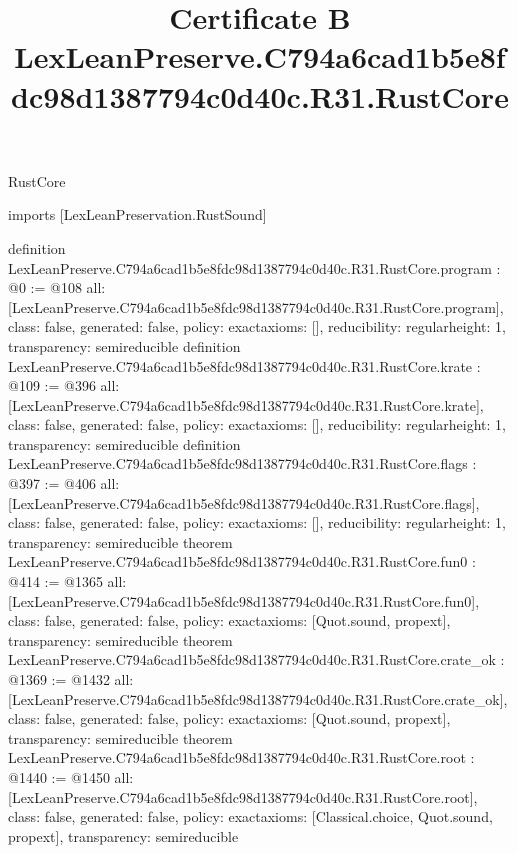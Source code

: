 \begin{lexlean}{RustCore}
\title{Certificate B LexLeanPreserve.C794a6cad1b5e8fdc98d1387794c0d40c.R31.RustCore}
\begin{coremodule}
imports [LexLeanPreservation.RustSound]

definition LexLeanPreserve.C794a6cad1b5e8fdc98d1387794c0d40c.R31.RustCore.program : @0 := @108 {
  all: [LexLeanPreserve.C794a6cad1b5e8fdc98d1387794c0d40c.R31.RustCore.program],
  class: false,
  generated: false,
  policy: exact{axioms: []},
  reducibility: regular{height: 1},
  transparency: semireducible
}
definition LexLeanPreserve.C794a6cad1b5e8fdc98d1387794c0d40c.R31.RustCore.krate : @109 := @396 {
  all: [LexLeanPreserve.C794a6cad1b5e8fdc98d1387794c0d40c.R31.RustCore.krate],
  class: false,
  generated: false,
  policy: exact{axioms: []},
  reducibility: regular{height: 1},
  transparency: semireducible
}
definition LexLeanPreserve.C794a6cad1b5e8fdc98d1387794c0d40c.R31.RustCore.flags : @397 := @406 {
  all: [LexLeanPreserve.C794a6cad1b5e8fdc98d1387794c0d40c.R31.RustCore.flags],
  class: false,
  generated: false,
  policy: exact{axioms: []},
  reducibility: regular{height: 1},
  transparency: semireducible
}
theorem LexLeanPreserve.C794a6cad1b5e8fdc98d1387794c0d40c.R31.RustCore.fun0 : @414 := @1365 {
  all: [LexLeanPreserve.C794a6cad1b5e8fdc98d1387794c0d40c.R31.RustCore.fun0],
  class: false,
  generated: false,
  policy: exact{axioms: [Quot.sound, propext]},
  transparency: semireducible
}
theorem LexLeanPreserve.C794a6cad1b5e8fdc98d1387794c0d40c.R31.RustCore.crate_ok : @1369 := @1432 {
  all: [LexLeanPreserve.C794a6cad1b5e8fdc98d1387794c0d40c.R31.RustCore.crate_ok],
  class: false,
  generated: false,
  policy: exact{axioms: [Quot.sound, propext]},
  transparency: semireducible
}
theorem LexLeanPreserve.C794a6cad1b5e8fdc98d1387794c0d40c.R31.RustCore.root : @1440 := @1450 {
  all: [LexLeanPreserve.C794a6cad1b5e8fdc98d1387794c0d40c.R31.RustCore.root],
  class: false,
  generated: false,
  policy: exact{axioms: [Classical.choice, Quot.sound, propext]},
  transparency: semireducible
}


\end{coremodule}
\end{lexlean}
